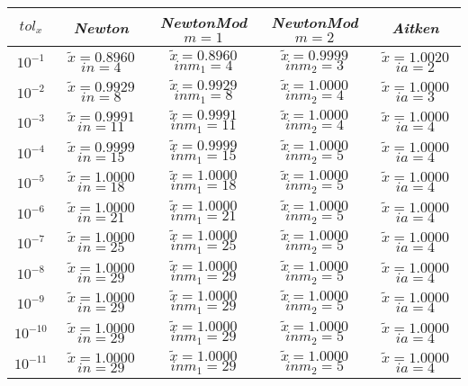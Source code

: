 \begin{center}
	\begin{tabular}{|c|c|c|c|c|}
		\hline
			$tol_x$ & \textit{Newton} & \textit{NewtonMod $m=1$} & \textit{NewtonMod $m=2$} & \textit{Aitken} \\
		\hline
			$10^{-1}$ & $\tilde{x} = 0.8960$ \quad $in = 4$ & $\tilde{x} = 0.8960$ \quad $inm_1 = 4$ & $\tilde{x} = 0.9999$ \quad $inm_2 = 3$ & $\tilde{x} = 1.0020$ \quad $ia = 2$\\
			$10^{-2}$ & $\tilde{x} = 0.9929$ \quad $in = 8$ & $\tilde{x} = 0.9929$ \quad $inm_1 = 8$ & $\tilde{x} = 1.0000$ \quad $inm_2 = 4$ & $\tilde{x} = 1.0000$ \quad $ia = 3$\\
			$10^{-3}$ & $\tilde{x} = 0.9991$ \quad $in = 11$ & $\tilde{x} = 0.9991$ \quad $inm_1 = 11$ & $\tilde{x} = 1.0000$ \quad $inm_2 = 4$ & $\tilde{x} = 1.0000$ \quad $ia = 4$\\
			$10^{-4}$ & $\tilde{x} = 0.9999$ \quad $in = 15$ & $\tilde{x} = 0.9999$ \quad $inm_1 = 15$ & $\tilde{x} = 1.0000$ \quad $inm_2 = 5$ & $\tilde{x} = 1.0000$ \quad $ia = 4$\\
			$10^{-5}$ & $\tilde{x} = 1.0000$ \quad $in = 18$ & $\tilde{x} = 1.0000$ \quad $inm_1 = 18$ & $\tilde{x} = 1.0000$ \quad $inm_2 = 5$ & $\tilde{x} = 1.0000$ \quad $ia = 4$\\
			$10^{-6}$ & $\tilde{x} = 1.0000$ \quad $in = 21$ & $\tilde{x} = 1.0000$ \quad $inm_1 = 21$ & $\tilde{x} = 1.0000$ \quad $inm_2 = 5$ & $\tilde{x} = 1.0000$ \quad $ia = 4$\\
			$10^{-7}$ & $\tilde{x} = 1.0000$ \quad $in = 25$ & $\tilde{x} = 1.0000$ \quad $inm_1 = 25$ & $\tilde{x} = 1.0000$ \quad $inm_2 = 5$ & $\tilde{x} = 1.0000$ \quad $ia = 4$\\
			$10^{-8}$ & $\tilde{x} = 1.0000$ \quad $in = 29$ & $\tilde{x} = 1.0000$ \quad $inm_1 = 29$ & $\tilde{x} = 1.0000$ \quad $inm_2 = 5$ & $\tilde{x} = 1.0000$ \quad $ia = 4$\\
			$10^{-9}$ & $\tilde{x} = 1.0000$ \quad $in = 29$ & $\tilde{x} = 1.0000$ \quad $inm_1 = 29$ & $\tilde{x} = 1.0000$ \quad $inm_2 = 5$ & $\tilde{x} = 1.0000$ \quad $ia = 4$\\
			$10^{-10}$ & $\tilde{x} = 1.0000$ \quad $in = 29$ & $\tilde{x} = 1.0000$ \quad $inm_1 = 29$ & $\tilde{x} = 1.0000$ \quad $inm_2 = 5$ & $\tilde{x} = 1.0000$ \quad $ia = 4$\\
			$10^{-11}$ & $\tilde{x} = 1.0000$ \quad $in = 29$ & $\tilde{x} = 1.0000$ \quad $inm_1 = 29$ & $\tilde{x} = 1.0000$ \quad $inm_2 = 5$ & $\tilde{x} = 1.0000$ \quad $ia = 4$\\

\end{tabular}
\end{center}
